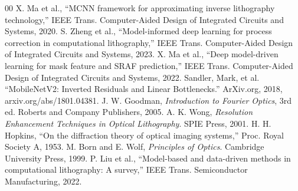 \documentclass[conference]{IEEEtran}
\begin{document}
\begin{thebibliography}{00}
 X. Ma et al., “MCNN framework for approximating inverse lithography technology,” IEEE Trans. Computer-Aided Design of Integrated Circuits and Systems, 2020.
 S. Zheng et al., “Model-informed deep learning for process correction in computational lithography,” IEEE Trans. Computer-Aided Design of Integrated Circuits and Systems, 2023.
 X. Ma et al., “Deep model-driven learning for mask feature and SRAF prediction,” IEEE Trans. Computer-Aided Design of Integrated Circuits and Systems, 2022.
 Sandler, Mark, et al. “MobileNetV2: Inverted Residuals and Linear Bottlenecks.” ArXiv.org, 2018, arxiv.org/abs/1801.04381.
 J. W. Goodman, \textit{Introduction to Fourier Optics}, 3rd ed. Roberts and Company Publishers, 2005.
 A. K. Wong, \textit{Resolution Enhancement Techniques in Optical Lithography}. SPIE Press, 2001.
 H. H. Hopkins, “On the diffraction theory of optical imaging systems,” Proc. Royal Society A, 1953.
 M. Born and E. Wolf, \textit{Principles of Optics}. Cambridge University Press, 1999.
 P. Liu et al., “Model-based and data-driven methods in computational lithography: A survey,” IEEE Trans. Semiconductor Manufacturing, 2022.

\end{thebibliography}
\end{document}
